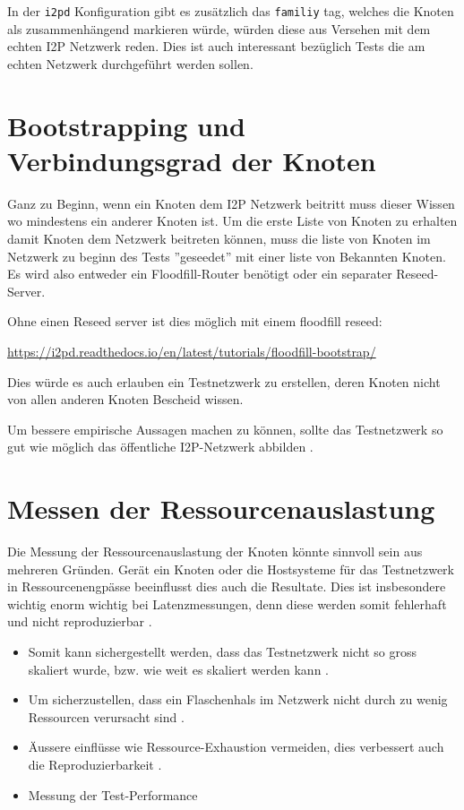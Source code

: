 In der \lstinline|i2pd| Konfiguration gibt es zusätzlich das \lstinline|familiy| tag, welches die Knoten als zusammenhängend markieren würde, würden diese aus Versehen mit dem echten I2P Netzwerk reden. Dies ist auch interessant bezüglich Tests die am echten Netzwerk durchgeführt werden sollen.


\section{Bootstrapping und Verbindungsgrad der Knoten}

Ganz zu Beginn, wenn ein Knoten dem I2P Netzwerk beitritt muss dieser Wissen wo mindestens ein anderer Knoten ist.
Um die erste Liste von Knoten zu erhalten damit Knoten dem Netzwerk beitreten können, muss die liste von Knoten im Netzwerk zu beginn des Tests ''geseedet'' mit einer liste von Bekannten Knoten.
Es wird also entweder ein Floodfill-Router benötigt oder ein separater Reseed-Server.

Ohne einen Reseed server ist dies möglich mit einem floodfill reseed:

\url{https://i2pd.readthedocs.io/en/latest/tutorials/floodfill-bootstrap/}

Dies würde es auch erlauben ein Testnetzwerk zu erstellen, deren Knoten nicht von allen anderen Knoten Bescheid wissen.


Um bessere empirische Aussagen machen zu können, sollte das Testnetzwerk so gut wie möglich das öffentliche I2P-Netzwerk abbilden .


\section{Messen der Ressourcenauslastung}\label{sec:ressourcenauslastung}


Die Messung der Ressourcenauslastung der Knoten könnte sinnvoll sein aus mehreren Gründen.
Gerät ein Knoten oder die Hostsysteme für das Testnetzwerk in Ressourcenengpässe beeinflusst dies auch die Resultate.
Dies ist insbesondere wichtig enorm wichtig bei Latenzmessungen, denn diese werden somit fehlerhaft und nicht reproduzierbar .

\begin{itemize}
    \item Somit kann sichergestellt werden, dass das Testnetzwerk nicht so gross skaliert wurde, bzw. wie weit es skaliert werden kann .
    \item Um sicherzustellen, dass ein Flaschenhals im Netzwerk nicht durch zu wenig Ressourcen verursacht sind .
    \item Äussere einflüsse wie Ressource-Exhaustion vermeiden, dies verbessert auch die Reproduzierbarkeit .
    \item Messung der Test-Performance
\end{itemize}

